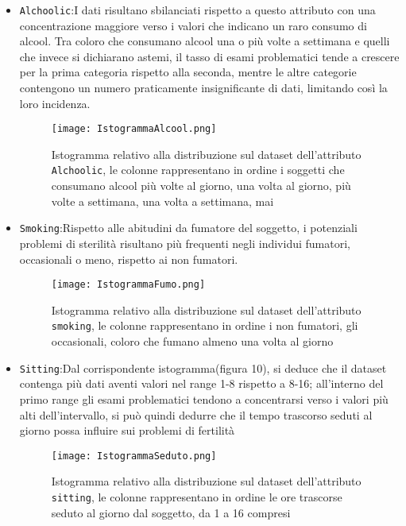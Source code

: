 \begin{itemize}
	\item \texttt{Alchoolic}:I dati risultano sbilanciati rispetto a questo attributo con una concentrazione maggiore verso i valori che indicano un raro consumo di alcool. Tra coloro che consumano alcool una o più volte a settimana e quelli che invece si dichiarano astemi, il tasso di esami problematici tende a crescere per la prima categoria rispetto alla seconda, mentre le altre categorie contengono un numero praticamente insignificante di dati, limitando così la loro incidenza.
	
		\begin{figure}[H]
		\texttt{[image: IstogrammaAlcool.png]}
		\caption{Istogramma relativo alla distribuzione sul dataset dell'attributo \texttt{Alchoolic}, le colonne rappresentano in ordine i soggetti che consumano alcool più volte al giorno, una volta al giorno, più volte a settimana, una volta a settimana, mai}
	\end{figure}
	
	\item \texttt{Smoking}:Rispetto alle abitudini da fumatore del soggetto, i potenziali problemi di sterilità risultano più frequenti negli individui fumatori, occasionali o meno, rispetto ai non fumatori.
	
		\begin{figure}[H]
		\texttt{[image: IstogrammaFumo.png]}
		\caption{Istogramma relativo alla distribuzione sul dataset dell'attributo \texttt{smoking}, le colonne rappresentano in ordine i non fumatori, gli occasionali, coloro che fumano almeno una volta al giorno}
	\end{figure}
	
	
	\item \texttt{Sitting}:Dal corrispondente istogramma(figura 10), si deduce che il dataset contenga più dati aventi valori nel range 1-8 rispetto a 8-16; all'interno del primo range gli esami problematici tendono a concentrarsi verso i valori più alti dell'intervallo, si può quindi dedurre che il tempo trascorso seduti al giorno possa influire sui problemi di fertilità
	
		\begin{figure}[H]
		\texttt{[image: IstogrammaSeduto.png]}
		\caption{Istogramma relativo alla distribuzione sul dataset dell'attributo \texttt{sitting}, le colonne rappresentano in ordine le ore trascorse seduto al giorno dal soggetto, da 1 a 16 compresi}
	\end{figure}
	
\end{itemize} 

